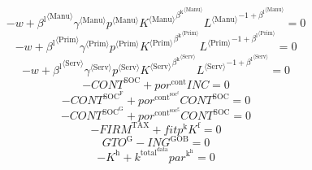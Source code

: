 \begin{equation}
-w + {{\beta^{\mathrm{l}}}^{\langle \mathrm{\mathrm{Manu}}\rangle}} {{\gamma}^{\langle \mathrm{\mathrm{Manu}}\rangle}} {{p}^{\langle \mathrm{Manu}\rangle}} {{{K}^{\langle \mathrm{Manu}\rangle}}^{{\beta^{\mathrm{k}}}^{\langle \mathrm{\mathrm{Manu}}\rangle}}} {{{L}^{\langle \mathrm{Manu}\rangle}}^{-1 + {\beta^{\mathrm{l}}}^{\langle \mathrm{\mathrm{Manu}}\rangle}}} = 0
\end{equation}
\begin{equation}
-w + {{\beta^{\mathrm{l}}}^{\langle \mathrm{\mathrm{Prim}}\rangle}} {{\gamma}^{\langle \mathrm{\mathrm{Prim}}\rangle}} {{p}^{\langle \mathrm{Prim}\rangle}} {{{K}^{\langle \mathrm{Prim}\rangle}}^{{\beta^{\mathrm{k}}}^{\langle \mathrm{\mathrm{Prim}}\rangle}}} {{{L}^{\langle \mathrm{Prim}\rangle}}^{-1 + {\beta^{\mathrm{l}}}^{\langle \mathrm{\mathrm{Prim}}\rangle}}} = 0
\end{equation}
\begin{equation}
-w + {{\beta^{\mathrm{l}}}^{\langle \mathrm{\mathrm{Serv}}\rangle}} {{\gamma}^{\langle \mathrm{\mathrm{Serv}}\rangle}} {{p}^{\langle \mathrm{Serv}\rangle}} {{{K}^{\langle \mathrm{Serv}\rangle}}^{{\beta^{\mathrm{k}}}^{\langle \mathrm{\mathrm{Serv}}\rangle}}} {{{L}^{\langle \mathrm{Serv}\rangle}}^{-1 + {\beta^{\mathrm{l}}}^{\langle \mathrm{\mathrm{Serv}}\rangle}}} = 0
\end{equation}
\begin{equation}
-{C\!O\!N\!T}^{\mathrm{SOC}} + {{p\!o\!r}^{\mathrm{cont}}} {{I\!N\!C}} = 0
\end{equation}
\begin{equation}
-{C\!O\!N\!T}^{\mathrm{SOC}^{\mathrm{F}}} + {{p\!o\!r}^{\mathrm{cont}^{\mathrm{soc}^{\mathrm{f}}}}} {{C\!O\!N\!T}^{\mathrm{SOC}}} = 0
\end{equation}
\begin{equation}
-{C\!O\!N\!T}^{\mathrm{SOC}^{\mathrm{G}}} + {{p\!o\!r}^{\mathrm{cont}^{\mathrm{soc}^{\mathrm{g}}}}} {{C\!O\!N\!T}^{\mathrm{SOC}}} = 0
\end{equation}
\begin{equation}
-{F\!I\!R\!M}^{\mathrm{TAX}} + {{f\!i\!t}} {p^{\mathrm{k}}} {K^{\mathrm{f}}} = 0
\end{equation}
\begin{equation}
{G\!T\!O}^{\mathrm{G}} - {I\!N\!G}^{\mathrm{GOB}} = 0
\end{equation}
\begin{equation}
-K^{\mathrm{h}} + {k^{\mathrm{total}^{\mathrm{data}}}} {{p\!a\!r}^{\mathrm{k}^{\mathrm{h}}}} = 0
\end{equation}

